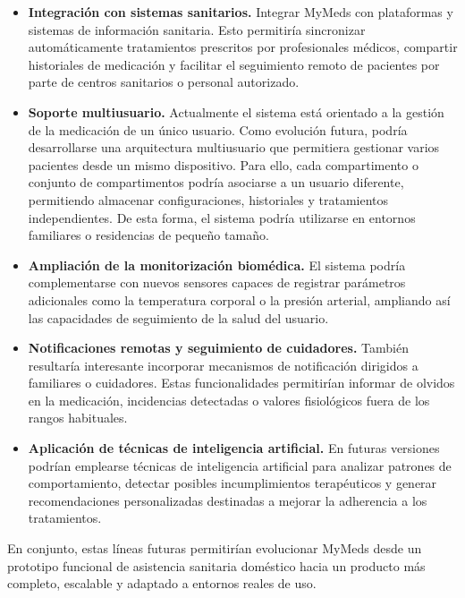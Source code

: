 \begin{itemize}

\item \textbf{Integración con sistemas sanitarios.} Integrar MyMeds con plataformas y sistemas de información sanitaria. Esto permitiría sincronizar automáticamente tratamientos prescritos por profesionales médicos, compartir historiales de medicación y facilitar el seguimiento remoto de pacientes por parte de centros sanitarios o personal autorizado.

\item \textbf{Soporte multiusuario.} Actualmente el sistema está orientado a la gestión de la medicación de un único usuario. Como evolución futura, podría desarrollarse una arquitectura multiusuario que permitiera gestionar varios pacientes desde un mismo dispositivo. Para ello, cada compartimento o conjunto de compartimentos podría asociarse a un usuario diferente, permitiendo almacenar configuraciones, historiales y tratamientos independientes. De esta forma, el sistema podría utilizarse en entornos familiares o residencias de pequeño tamaño.

\item \textbf{Ampliación de la monitorización biomédica.} El sistema podría complementarse con nuevos sensores capaces de registrar parámetros adicionales como la temperatura corporal o la presión arterial, ampliando así las capacidades de seguimiento de la salud del usuario.

\item \textbf{Notificaciones remotas y seguimiento de cuidadores.} También resultaría interesante incorporar mecanismos de notificación dirigidos a familiares o cuidadores. Estas funcionalidades permitirían informar de olvidos en la medicación, incidencias detectadas o valores fisiológicos fuera de los rangos habituales.

\item \textbf{Aplicación de técnicas de inteligencia artificial.} En futuras versiones podrían emplearse técnicas de inteligencia artificial para analizar patrones de comportamiento, detectar posibles incumplimientos terapéuticos y generar recomendaciones personalizadas destinadas a mejorar la adherencia a los tratamientos.

\end{itemize}

En conjunto, estas líneas futuras permitirían evolucionar MyMeds desde un prototipo funcional de asistencia sanitaria doméstico hacia un producto más completo, escalable y adaptado a entornos reales de uso.


